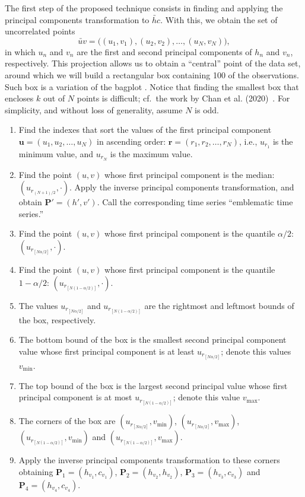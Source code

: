 \documentclass[a4,11pt]{pssbmac}
\begin{document}
	The first step of the proposed technique consists in finding and applying the principal components transformation to $\utilde{hc}$.
	With this, we obtain the set of uncorrelated points 
	$$\utilde{uv}=\big((u_1,v_1), (u_2,v_2),\dots,(u_N,v_N)\big),$$ 
	in which $u_n$ and $v_n$ are the first and second principal components of $h_n$ and $v_n$, respectively.
	This projection allows us to obtain a ``central'' point of the data set, around which we will build a rectangular box containing \SI{100}{\minusalphapercent} of the observations.
	Such box is a variation of the bagplot \cite{TheBagplotaBivariateBoxplot}.
	Notice that finding the smallest box that encloses $k$ out of $N$ points is difficult; cf.\ the work by Chan et al. (2020)~\cite{SmallestKEnclosingRectangleRevisited}.
	For simplicity, and without loss of generality, assume $N$ is odd.
	\begin{enumerate}
		\item Find the indexes that sort the values of the first principal component $\bm u=(u_1,u_2,\dots,u_N)$ in ascending order: $\bm r=(r_1,r_2,\dots,r_N)$, i.e., $u_{r_1}$ is the minimum value, and $u_{r_N}$ is the maximum value.
		\item\label{item:Median} Find the point $(u,v)$ whose first principal component is the median: $(u_{r_{(N+1)/2}}, \cdot)$. Apply the inverse principal components transformation, and obtain $\bm P'=(h',v')$. Call the corresponding time series ``emblematic time series.''
		\item\label{item:Point1} Find the point $(u,v)$ whose first principal component is the quantile $\alpha/2$: $(u_{r_{[N\alpha/2]}}, \cdot)$.
		\item\label{item:Point2} Find the point $(u,v)$ whose first principal component is the quantile $1-\alpha/2$: $(u_{r_{[N(1-\alpha/2)]}}, \cdot)$.
		\item\label{item:Point3} The values $u_{r_{[N\alpha/2]}}$ and $u_{r_{[N(1-\alpha/2)]}}$ are the rightmost and leftmost bounds of the box, respectively.
		\item\label{item:Point4} The bottom bound of the box is the smallest second principal component value whose first principal component is at least $u_{r_{[N\alpha/2]}}$; denote this values $v_{\min}$.
		\item\label{item:Point5} The top bound of the box is the largest second principal value whose first principal component is at most $u_{r_{[N(1-\alpha/2)]}}$; denote this value $v_{\max}$.
		\item The corners of the box are 
		$(u_{r_{[N\alpha/2]}}, v_{\min})$, 
		$(u_{r_{[N\alpha/2]}}, v_{\max})$, 
		$(u_{r_{[N(1-\alpha/2)]}}, v_{\min})$ and 
		$(u_{r_{[N(1-\alpha/2)]}},v_{\max})$.
		\item\label{item:BoxHxC} Apply the inverse principal components transformation to these corners obtaining $\bm P_1=(h_{v_1}, c_{v_1})$, $\bm P_2=(h_{v_2},h_{v_2})$, $\bm P_3=(h_{v_3}, c_{v_3})$ and $\bm P_4=(h_{v_4},c_{v_4})$.
	\end{enumerate}
	
\end{document}
